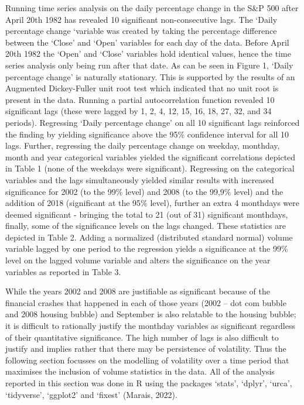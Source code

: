 \documentclass[11pt,preprint, authoryear]{elsarticle}
\numberwithin{equation}{section}
\numberwithin{figure}{section}
\numberwithin{table}{section}
\begin{document}
Running time series analysis on the daily percentage change in the S\&P
500 after April 20th 1982 has revealed 10 significant non-consecutive
lags. The `Daily percentage change `variable was created by taking the
percentage difference between the `Close' and `Open' variables for each
day of the data. Before April 20th 1982 the `Open' and `Close' variables
hold identical values, hence the time series analysis only being run
after that date. As can be seen in Figure 1, `Daily percentage change'
is naturally stationary. This is supported by the results of an
Augmented Dickey-Fuller unit root test which indicated that no unit root
is present in the data. Running a partial autocorrelation function
revealed 10 significant lags (these were lagged by 1, 2, 4, 12, 15, 16,
18, 27, 32, and 34 periods). Regressing `Daily percentage change' on all
10 significant lags reinforced the finding by yielding significance
above the 95\% confidence interval for all 10 lags. Further, regressing
the daily percentage change on weekday, monthday, month and year
categorical variables yielded the significant correlations depicted in
Table 1 (none of the weekdays were significant). Regressing on the
categorical variables and the lags simultaneously yielded similar
results with increased significance for 2002 (to the 99\% level) and
2008 (to the 99,9\% level) and the addition of 2018 (significant at the
95\% level), further an extra 4 monthdays were deemed significant -
bringing the total to 21 (out of 31) significant monthdays, finally,
some of the significance levels on the lags changed. These statistics
are depicted in Table 2. Adding a normalized (distributed standard
normal) volume variable lagged by one period to the regression yields a
significance at the 99\% level on the lagged volume variable and alters
the significance on the year variables as reported in Table 3.

While the years 2002 and 2008 are justifiable as significant because of
the financial crashes that happened in each of those years (2002 -- dot
com bubble and 2008 housing bubble) and September is also relatable to
the housing bubble; it is difficult to rationally justify the monthday
variables as significant regardless of their quantitative significance.
The high number of lags is also difficult to justify and implies rather
that there may be persistence of volatility. Thus the following section
focusses on the modelling of volatility over a time period that
maximises the inclusion of volume statistics in the data. All of the
analysis reported in this section was done in R using the packages
`stats', `dplyr', `urca', `tidyverse', `ggplot2' and `fixest' (Marais,
2022).
\end{document}

